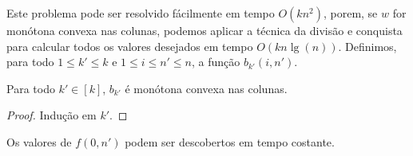 Este problema pode ser resolvido fácilmente em tempo $O(kn^2)$, porem, se $w$ for monótona convexa nas colunas, podemos aplicar a técnica da divisão e conquista para calcular todos os valores desejados em tempo $O(kn\lg(n))$. Definimos, para todo $1 \leq k' \leq k$ e $1 \leq i \leq n' \leq n$, a função $b_{k'}(i,n')$.

\begin{prop}
Para todo $k' \in [k]$, $b_{k'}$ é monótona convexa nas colunas.
\end{prop}

\begin{proof}
Indução em $k'$.
\end{proof}

Os valores de $f(0,n')$ podem ser descobertos em tempo costante. 
